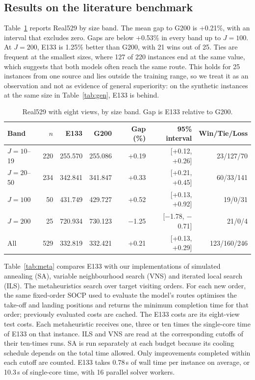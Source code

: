 \documentclass[preprint,12pt,authoryear]{elsarticle}
\begin{document}
\subsection{Results on the literature benchmark}
\label{sec:real}

Table~\ref{tab:real} reports Real529 by size band. The mean gap to G200 is +0.21\%, with an interval that excludes zero. Gaps are below +0.53\% in every band up to $J = 100$. At $J = 200$, E133 is 1.25\% better than G200, with 21 wins out of 25. Ties are frequent at the smallest sizes, where 127 of 220 instances end at the same value, which suggests that both models often reach the same route. This holds for 25 instances from one source and lies outside the training range, so we treat it as an observation and not as evidence of general superiority: on the synthetic instances at the same size in Table~\ref{tab:gen}, E133 is behind.

\begin{table}[t]
\centering
\caption{Real529 with eight views, by size band. Gap is E133 relative to G200.}
\label{tab:real}
\small
\begin{tabular}{lrrrrrr}
\toprule
Band & $n$ & E133 & G200 & Gap (\%) & 95\% interval & Win/Tie/Loss \\
\midrule
$J = 10$--19 & 220 & 255.570 & 255.086 & +0.19 & [+0.12, +0.26] & 23/127/70 \\
$J = 20$--50 & 234 & 342.841 & 341.847 & +0.33 & [+0.21, +0.45] & 60/33/141 \\
$J = 100$ & 50 & 431.749 & 429.727 & +0.52 & [+0.13, +0.92] & 19/0/31 \\
$J = 200$ & 25 & 720.934 & 730.123 & $-$1.25 & [$-$1.78, $-$0.71] & 21/0/4 \\
All & 529 & 332.819 & 332.421 & +0.21 & [+0.13, +0.29] & 123/160/246 \\
\bottomrule
\end{tabular}
\end{table}

Table~\ref{tab:meta} compares E133 with our implementations of simulated annealing (SA), variable neighbourhood search (VNS) and iterated local search (ILS). The metaheuristics search over target visiting orders. For each new order, the same fixed-order SOCP used to evaluate the model's routes optimises the take-off and landing positions and returns the minimum completion time for that order; previously evaluated costs are cached. The E133 costs are its eight-view test costs. Each metaheuristic receives one, three or ten times the single-core time of E133 on that instance. ILS and VNS are read at the corresponding cutoffs of their ten-times runs. SA is run separately at each budget because its cooling schedule depends on the total time allowed. Only improvements completed within each cutoff are counted. E133 takes 0.78\,s of wall time per instance on average, or 10.3\,s of single-core time, with 16 parallel solver workers.
\end{document}
